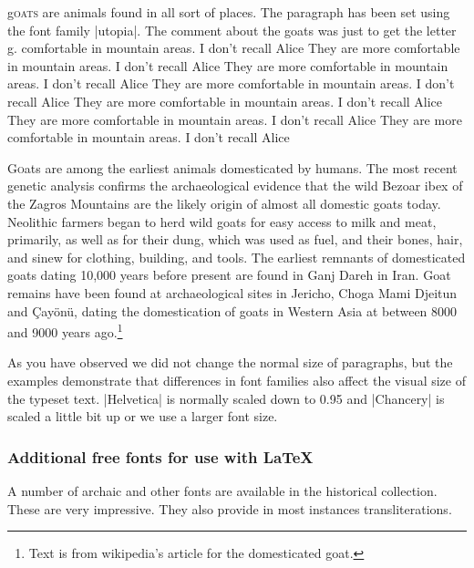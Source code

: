 \renewcommand{\LettrineFontHook}{\fontfamily{phv}\fontseries{bx}}%



\par\leavevmode

\lettrine[lines=5, lhang=0.1,lraise=0.28,findent=1pt]{g}{oats} are animals found in all sort of places. The paragraph has been set using the font family |utopia|. The comment about the goats was just to get the letter g.
comfortable in mountain areas. I don't recall Alice  They are more
comfortable in mountain areas. I don't recall Alice   They are more
comfortable in mountain areas. I don't recall Alice   They are more
comfortable in mountain areas. I don't recall Alice  They are more
comfortable in mountain areas. I don't recall Alice  They are more
comfortable in mountain areas. I don't recall Alice  They are more
comfortable in mountain areas. I don't recall Alice 

\medskip



\lettrine{G}{o}ats are among the earliest animals domesticated by humans. The most recent genetic analysis confirms the archaeological evidence that the wild Bezoar ibex of the Zagros Mountains are the likely origin of almost all domestic goats today. Neolithic farmers began to herd wild goats for easy access to milk and meat, primarily, as well as for their dung, which was used as fuel, and their bones, hair, and sinew for clothing, building, and tools. The earliest remnants of domesticated goats dating 10,000 years before present are found in Ganj Dareh in Iran. Goat remains have been found at archaeological sites in Jericho, Choga Mami Djeitun and Çay\"on\"u, dating the domestication of goats in Western Asia at between 8000 and 9000 years ago.\footnote{Text is from wikipedia's article for the domesticated goat.}

\bgroup
{}

As you have observed we did not change the normal size of paragraphs, but the examples demonstrate that differences in font families also affect the visual size of the typeset text. |Helvetica| is normally scaled down to 0.95 and |Chancery| is scaled a little bit up or we use a larger font size.
\egroup



\subsubsection*{\textsf{Additional free fonts for use with \LaTeX}}
A number of archaic and other fonts are available in the \latexe historical collection. These are very impressive. They also provide in most instances transliterations.

